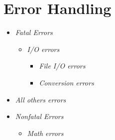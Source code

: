 \section{Error Handling}\label{sec:Error Handling}

\begin{itemize}

  \item \textit{Fatal Errors}
    \begin{itemize}
      \item \textit{I/O errors}
      \begin{itemize}
	\item \textit{File I/O errors}
	\item \textit{Conversion errors}
      \end{itemize}	
    \end{itemize}	
  \item \textit{All others errors}
  \item \textit{Nonfatal Errors}
    \begin{itemize}
      \item \textit{Math errors}
     \end{itemize}	
\end{itemize}

\begin{description}
  \item \textit{  }
  \item \textit{  }
  \item \textit{  }
  \item \textit{  }
\end{description}

